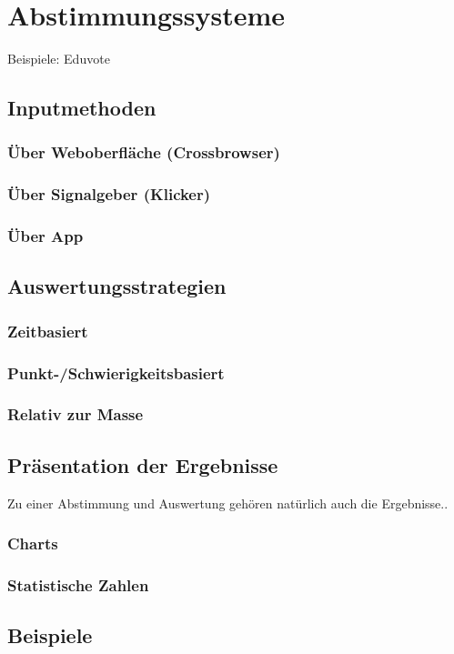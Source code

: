 \chapter{Abstimmungssysteme}
\label{cha:Abstimmungssysteme}
Beispiele: Eduvote

\section{Inputmethoden}
\subsection{Über Weboberfläche (Crossbrowser)}
\subsection{Über Signalgeber (Klicker)}
\subsection{Über App}

\section{Auswertungsstrategien}
\subsection{Zeitbasiert}
\subsection{Punkt-/Schwierigkeitsbasiert}
\subsection{Relativ zur Masse}

\section{Präsentation der Ergebnisse}
Zu einer Abstimmung und Auswertung gehören natürlich auch die Ergebnisse..
\subsection{Charts}
\subsection{Statistische Zahlen}

\section{Beispiele}


